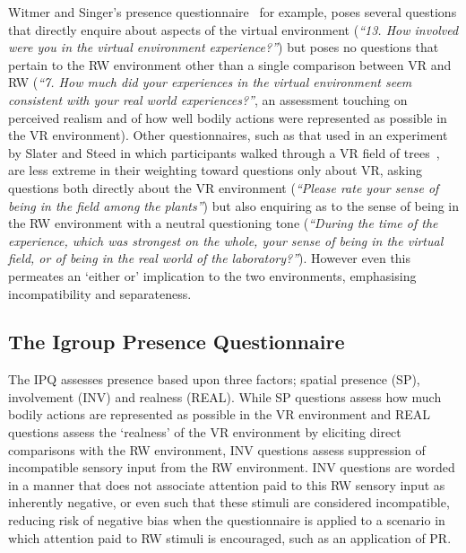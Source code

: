Witmer and Singer's presence questionnaire~\cite{Witmer1998} for example, poses several questions that directly enquire about aspects of the virtual environment (\textit{``13. How involved were you in the virtual environment experience?''}) but poses no questions that pertain to the RW environment other than a single comparison between VR and RW (\textit{``7. How much did your experiences in the virtual environment seem consistent with your real world experiences?''}, an assessment touching on perceived realism and of how well bodily actions were represented as possible in the VR environment). Other questionnaires, such as that used in an experiment by Slater and Steed in which participants walked through a VR field of trees~\cite{Slater1998}, are less extreme in their weighting toward questions only about VR, asking questions both directly about the VR environment (\textit{``Please rate your sense of being in the field among the plants''}) but also enquiring as to the sense of being in the RW environment with a neutral questioning tone (\textit{``During the time of the experience, which was strongest on the whole, your sense of being in the virtual field, or of being in the real world of the laboratory?''}). However even this permeates an `either or' implication to the two environments, emphasising incompatibility and separateness.


\subsection{The Igroup Presence Questionnaire}
\label{igroup-presence-questionnaire-explanation}
The IPQ assesses presence based upon three factors; spatial presence (SP), involvement (INV) and realness (REAL). While SP questions assess how much bodily actions are represented as possible in the VR environment and REAL questions assess the `realness' of the VR environment by eliciting direct comparisons with the RW environment, INV questions assess suppression of incompatible sensory input from the RW environment. INV questions are worded in a manner that does not associate attention paid to this RW sensory input as inherently negative, or even such that these stimuli are considered incompatible, reducing risk of negative bias when the questionnaire is applied to a scenario in which attention paid to RW stimuli is encouraged, such as an application of PR.

